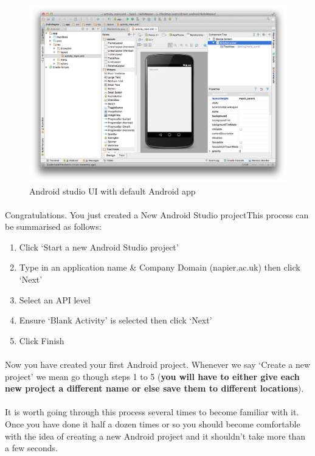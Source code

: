 \documentclass[12pt, a4paper, twoside]{book}
\begin{document}
\begin{figure}[H]
\centering
\includegraphics[width=\textwidth]{images/android-studio_08_studio-ui}
\caption{Android studio UI with default Android app}
\label{fig:android.studio_studioui}
\end{figure}

\paragraph{} Congratulations. You just created a New Android Studio projectThis process can be summarised as follows:

\begin{enumerate}
\item Click `Start a new Android Studio project'
\item Type in an application name \& Company Domain (napier.ac.uk) then click `Next'
\item Select an API level
\item Ensure `Blank Activity' is selected then click `Next'
\item Click Finish
\end{enumerate}

\paragraph{} Now you have created your first Android project. Whenever we say `Create a new project' we mean go though steps 1 to 5 ({\bf{you will have to either give each new project a different name or else save them to different locations}}).

\paragraph{} It is worth going through this process several times to become familiar with it. Once you have done it half a dozen times or so you should become comfortable with the idea of creating a new Android project and it shouldn't take more than a few seconds.
\end{document}

